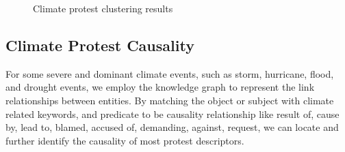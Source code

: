 \begin{figure}[t]
	\centering
	\caption{Climate protest clustering results}
\label{clusters}
\end{figure}


\subsection{Climate Protest Causality}
For some severe and dominant climate events, such as storm, hurricane, flood, and drought events, we employ the knowledge graph to represent the link relationships between entities. By matching the object or subject with climate related keywords, and predicate to be causality relationship like result of, cause by, lead to, blamed, accused of, demanding, against, request, we can locate and further identify the causality of most protest descriptors.

